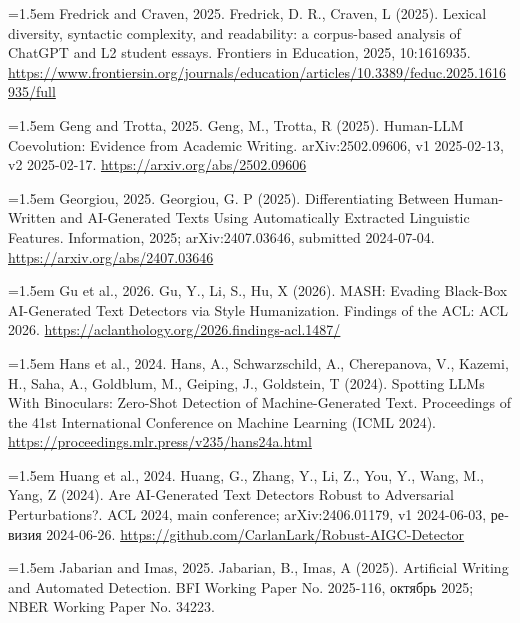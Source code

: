 \documentclass[11pt,a4paper]{article}
\renewcommand{\_}{\textunderscore\allowbreak}
\begin{document}
\noindent\hangindent=1.5em Fredrick and Craven, 2025. Fredrick, D. R., Craven, L (2025). Lexical diversity, syntactic complexity, and readability: a corpus-based analysis of ChatGPT and L2 student essays. Frontiers in Education, 2025, 10:1616935. \url{https://www.frontiersin.org/journals/education/articles/10.3389/feduc.2025.1616935/full}\par\smallskip

\noindent\hangindent=1.5em Geng and Trotta, 2025. Geng, M., Trotta, R (2025). Human-LLM Coevolution: Evidence from Academic Writing. arXiv:2502.09606, v1 2025-02-13, v2 2025-02-17. \url{https://arxiv.org/abs/2502.09606}\par\smallskip

\noindent\hangindent=1.5em Georgiou, 2025. Georgiou, G. P (2025). Differentiating Between Human-Written and AI-Generated Texts Using Automatically Extracted Linguistic Features. Information, 2025; arXiv:2407.03646, submitted 2024-07-04. \url{https://arxiv.org/abs/2407.03646}\par\smallskip

\noindent\hangindent=1.5em Gu et al., 2026. Gu, Y., Li, S., Hu, X (2026). MASH: Evading Black-Box AI-Generated Text Detectors via Style Humanization. Findings of the ACL: ACL 2026. \url{https://aclanthology.org/2026.findings-acl.1487/}\par\smallskip

\noindent\hangindent=1.5em Hans et al., 2024. Hans, A., Schwarzschild, A., Cherepanova, V., Kazemi, H., Saha, A., Goldblum, M., Geiping, J., Goldstein, T (2024). Spotting LLMs With Binoculars: Zero-Shot Detection of Machine-Generated Text. Proceedings of the 41st International Conference on Machine Learning (ICML 2024). \url{https://proceedings.mlr.press/v235/hans24a.html}\par\smallskip

\noindent\hangindent=1.5em Huang et al., 2024. Huang, G., Zhang, Y., Li, Z., You, Y., Wang, M., Yang, Z (2024). Are AI-Generated Text Detectors Robust to Adversarial Perturbations?. ACL 2024, main conference; arXiv:2406.01179, v1 2024-06-03, \foreignlanguage{russian}{ревизия} 2024-06-26. \url{https://github.com/CarlanLark/Robust-AIGC-Detector}\par\smallskip

\noindent\hangindent=1.5em Jabarian and Imas, 2025. Jabarian, B., Imas, A (2025). Artificial Writing and Automated Detection. BFI Working Paper No. 2025-116, \foreignlanguage{russian}{октябрь} 2025; NBER Working Paper No. 34223.\par\smallskip
\end{document}

